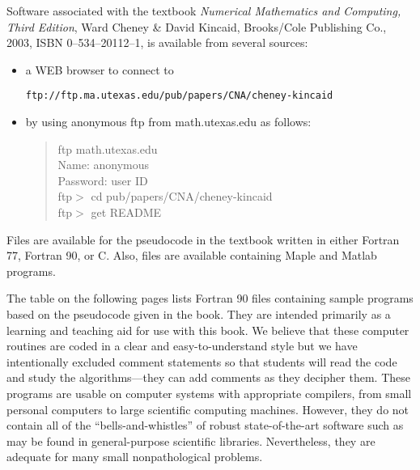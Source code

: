 \documentclass{article}
\begin{document}
Software associated with the textbook 
{\em Numerical Mathematics and Computing, Third Edition},
Ward Cheney \& David Kincaid, Brooks/Cole Publishing Co.,
2003, ISBN 0--534--20112--1, is available from several sources:

\begin{itemize}
\item
a WEB browser to connect to

{\tt ftp://ftp.ma.utexas.edu/pub/papers/CNA/cheney-kincaid}

\item
by using anonymous ftp from math.utexas.edu as follows:

\begin{verse}
ftp math.utexas.edu\\
Name: anonymous\\
Password: user ID\\
ftp$>$ cd pub/papers/CNA/cheney-kincaid\\
ftp$>$ get README 
\end{verse}
\end{itemize}

Files are available for the pseudocode in the textbook
written in either Fortran 77, Fortran 90, or C.
Also, files  are available containing Maple and Matlab programs.

The table on the following pages lists Fortran 90 
files containing sample programs 
based on the pseudocode given in the book.
They are intended  primarily as a learning and teaching aid 
for use with this book.
We believe that these computer routines are coded in a clear and
easy-to-understand style but we
have intentionally excluded comment statements 
so that students will read the code and study the algorithms---they
can add comments as they decipher them.
These programs are usable on computer systems with appropriate 
compilers, from
small personal computers to large scientific computing machines.
However, they do not contain all of the ``bells-and-whistles'' of
robust state-of-the-art software such as may be found in general-purpose
scientific libraries.
Nevertheless, they are adequate for many small nonpathological
problems.
\end{document}
